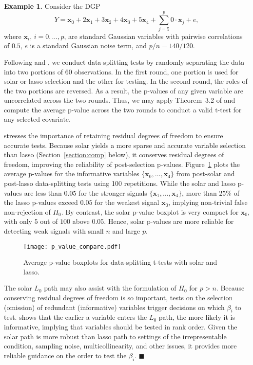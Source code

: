 \documentclass[11pt,review,authoryear]{elsarticle}
\begin{document}
\smallskip
\noindent
\textbf{Example 1.} Consider the DGP
%
\begin{equation}
  Y = \mathbf{x}_0 + 2 \mathbf{x}_1 + 3 \mathbf{x}_2 + 4 \mathbf{x}_3 + 5 \mathbf{x}_4 + \sum_{j=5}^{p} 0 \cdot \mathbf{x}_j + e,
\end{equation}
%
where $\mathbf{x}_i$, $i=0,\dots,p$, are standard Gaussian variables with pairwise correlations of $0.5$, $e$ is a standard Gaussian noise term, and $p/n=140/120$.

Following \citet[Example~4.1]{romano2019multiple} and \citet{diciccio2020exact}, we conduct data-splitting tests by randomly separating the data into two portions of 60 observations. In the first round, one portion is used for solar or lasso selection and the other for testing. In the second round, the roles of the two portions are reversed. As a result, the p-values of any given variable are uncorrelated across the two rounds. Thus, we may apply Theorem~3.2 of \citet{romano2019multiple} and compute the average p-value across the two rounds to conduct a valid t-test for any selected covariate.

\citet{diciccio2020exact} stresses the importance of retaining residual degrees of freedom to ensure accurate tests. Because solar yields a more sparse and accurate variable selection than lasso (Section~\ref{section:comp} below), it conserves residual degrees of freedom, improving the reliability of post-selection p-values. Figure~\ref{fig:p_value_compare} plots the average p-values for the informative variables $\{\mathbf{x}_0,\ldots,\mathbf{x}_4\}$ from post-solar and post-lasso data-splitting tests using 100 repetitions. While the solar and lasso p-values are less than $0.05$ for the stronger signals $\{\mathbf{x}_1,\ldots,\mathbf{x}_4\}$, more than $25\%$ of the lasso p-values exceed $0.05$ for the weakest signal $\mathbf{x}_0$, implying non-trivial false non-rejection of $H_0$. By contrast, the solar p-value boxplot is very compact for $\mathbf{x}_0$, with only $5$ out of $100$ above $0.05$. Hence, solar p-values are more reliable for detecting weak signals with small $n$ and large $p$.

\begin{figure}[ht]
%
  \centering
%
  \texttt{[image: p\_value\_compare.pdf]}
%
  \caption{Average p-value boxplots for data-splitting t-tests with solar and lasso.}
%
  \label{fig:p_value_compare}
%
\end{figure}

The solar $L_0$ path may also assist with the formulation of $H_0$ for $p>n$. Because conserving residual degrees of freedom is so important, tests on the selection (omission) of redundant (informative) variables trigger decisions on which $\beta_i$ to test. \citet[Theorem~2]{zhang09} shows that the earlier a variable enters the $L_0$ path, the more likely it is informative, implying that variables should be tested in rank order. Given the solar path is more robust than lasso path to settings of the irrepresentable condition, sampling noise, multicollinearity, and other issues, it provides more reliable guidance on the order to test the $\beta_i$. $\blacksquare$
\end{document}
